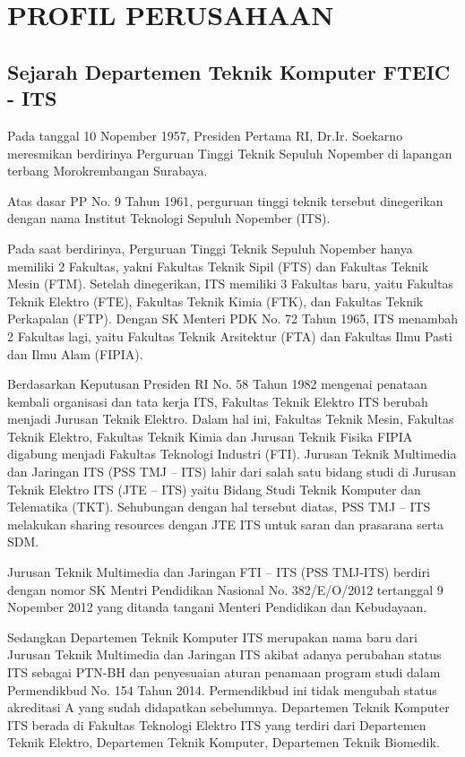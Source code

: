 \chapter{PROFIL PERUSAHAAN}


\section{Sejarah Departemen Teknik Komputer FTEIC - ITS}

Pada tanggal 10 Nopember 1957, Presiden Pertama RI, Dr.Ir. Soekarno meresmikan berdirinya Perguruan Tinggi Teknik Sepuluh Nopember di lapangan terbang Morokrembangan Surabaya.

Atas dasar PP No. 9 Tahun 1961, perguruan tinggi teknik tersebut dinegerikan dengan nama Institut Teknologi Sepuluh Nopember (ITS).

Pada saat berdirinya, Perguruan Tinggi Teknik Sepuluh Nopember hanya memiliki 2 Fakultas, yakni Fakultas Teknik Sipil (FTS) dan Fakultas Teknik Mesin (FTM). Setelah dinegerikan, ITS memiliki 3 Fakultas baru, yaitu Fakultas Teknik Elektro (FTE), Fakultas Teknik Kimia (FTK), dan Fakultas Teknik Perkapalan (FTP). Dengan SK Menteri PDK No. 72 Tahun 1965, ITS menambah 2 Fakultas lagi, yaitu Fakultas Teknik Arsitektur (FTA) dan Fakultas Ilmu Pasti dan Ilmu Alam (FIPIA).

Berdasarkan Keputusan Presiden RI No. 58 Tahun 1982 mengenai penataan kembali organisasi dan tata kerja ITS, Fakultas Teknik Elektro ITS berubah menjadi Jurusan Teknik Elektro. Dalam hal ini, Fakultas Teknik Mesin, Fakultas Teknik Elektro, Fakultas Teknik Kimia dan Jurusan Teknik Fisika FIPIA digabung menjadi Fakultas Teknologi Industri (FTI). Jurusan Teknik Multimedia dan Jaringan ITS (PSS TMJ – ITS) lahir dari salah satu bidang studi di Jurusan Teknik Elektro ITS (JTE – ITS) yaitu Bidang Studi Teknik Komputer dan Telematika (TKT). Sehubungan dengan hal tersebut diatas, PSS TMJ – ITS melakukan sharing resources dengan JTE ITS untuk saran dan prasarana serta SDM.

Jurusan Teknik Multimedia dan Jaringan FTI – ITS (PSS TMJ-ITS) berdiri dengan nomor SK Mentri Pendidikan Nasional No. 382/E/O/2012 tertanggal 9 Nopember 2012 yang ditanda tangani Menteri Pendidikan dan Kebudayaan.

Sedangkan Departemen Teknik Komputer ITS merupakan nama baru dari Jurusan Teknik Multimedia dan Jaringan ITS akibat adanya perubahan status ITS sebagai PTN-BH dan penyesuaian aturan penamaan program studi dalam Permendikbud No. 154 Tahun 2014. Permendikbud ini tidak mengubah status akreditasi A yang sudah didapatkan sebelumnya. Departemen Teknik Komputer ITS berada di Fakultas Teknologi Elektro ITS yang terdiri dari Departemen Teknik Elektro, Departemen Teknik Komputer,  Departemen Teknik Biomedik.

